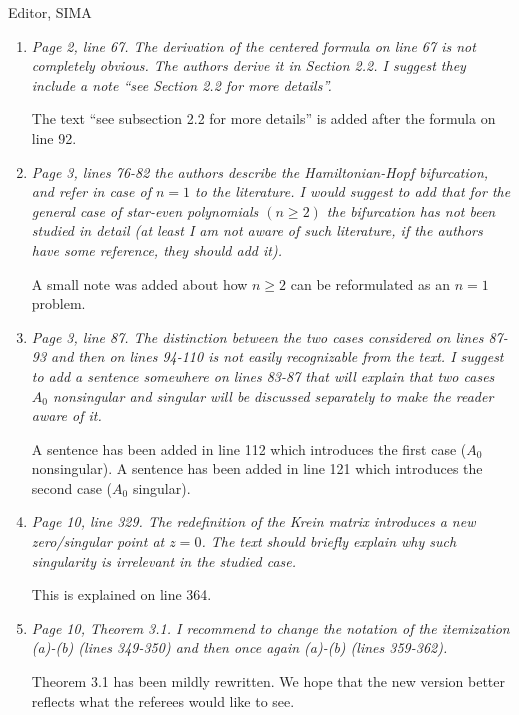 \documentclass[11pt]{letter}
\begin{document}
\begin{letter}{Editor, SIMA}
\begin{enumerate}
\item \emph{Page 2, line 67. The derivation of the centered formula on line 67 is not completely obvious. The authors derive it in Section 2.2. I suggest they include a note ``see Section 2.2 for more details''.}
\vspace{4mm}

The text ``see subsection 2.2 for more details'' is added after the formula on line 92.

\item \emph{Page 3, lines 76-82 the authors describe the Hamiltonian-Hopf bifurcation, and refer in case of $n = 1$ to the literature. I would suggest to add that for the general case of star-even polynomials $(n \geq 2)$ the bifurcation has not been studied in detail (at least I am not aware of such literature, if the authors have some reference, they should add it).}
\vspace{4mm}

A small note was added about how $n\ge2$ can be reformulated as an $n=1$ problem.

\item \emph{Page 3, line 87. The distinction between the two cases considered on lines 87-93 and then on lines 94-110 is not easily recognizable from the text. I suggest to add a sentence somewhere on lines 83-87 that will explain that two cases $A_0$ nonsingular and singular will be discussed separately to make the reader aware of it.}
\vspace{4mm}

A sentence has been added in line 112 which introduces the first case ($A_0$ nonsingular). A sentence has been added in line 121 which introduces the second case ($A_0$ singular).

\item \emph{Page 10, line 329. The redefinition of the Krein matrix introduces a new zero/singular point at $z = 0$. The text should briefly explain why such singularity is irrelevant in the studied case.}
\vspace{4mm}

This is explained on line 364.

\item \emph{Page 10, Theorem 3.1. I recommend to change the notation of the itemization (a)-(b) (lines 349-350) and then once again (a)-(b) (lines 359-362).}
\vspace{4mm}

Theorem 3.1 has been mildly rewritten.  We hope that the new version better reflects what the referees would like to see.


\end{enumerate}
\end{letter}
\end{document}
